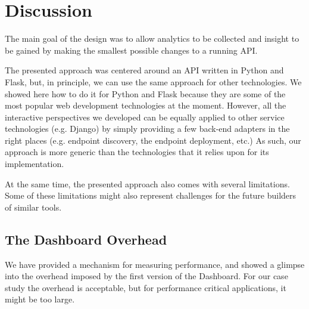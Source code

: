 
\section{Discussion}
\label{sec:discussion}



  The main goal of the \tool design was to allow analytics to be collected and insight to be gained by making the smallest possible changes to a running API. 


  The presented approach was centered around an API written in Python and Flask, but, in principle, 
  we can use the same approach for other technologies. We showed here how to do it for Python and Flask because they are some of the most popular web development technologies at the moment. However,
  all the interactive perspectives we developed can be equally applied to other service technologies (e.g. Django) by simply providing a few back-end adapters in the right places (e.g. endpoint discovery, the  endpoint deployment, etc.)
  As such, our approach is more generic than the technologies that it relies upon for its implementation. 

  At the same time, the presented approach also comes with several limitations. Some of these limitations might also represent challenges for the future builders of similar tools.

  \subsection*{The Dashboard Overhead}

    We have provided a mechanism for measuring performance, and showed a glimpse into the overhead imposed by the first version of the Dashboard. For our case study the overhead is acceptable, but for performance critical applications, it might be too large. 

